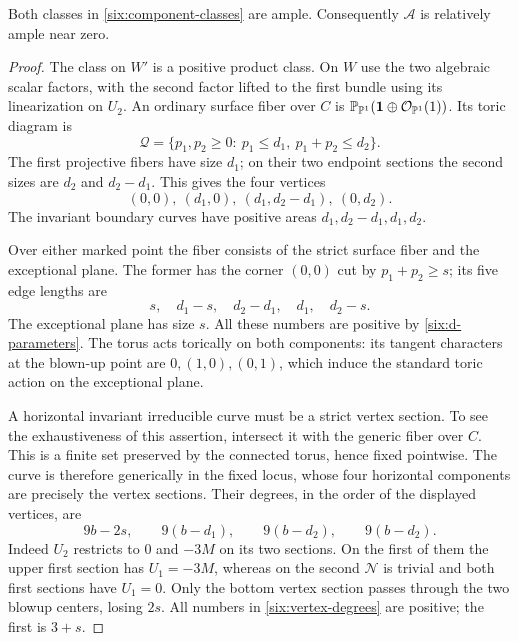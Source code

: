 \begin{lemma}\label{six:cubic-ampleness}
Both classes in \eqref{six:component-classes} are ample.
Consequently \(\mathcal A\) is relatively ample near zero.
\end{lemma}

\begin{proof}
The class on \(W'\) is a positive product class.  On \(W\) use
the two algebraic scalar factors, with the second factor lifted
to the first bundle using its linearization on \(U_2\).
An ordinary surface fiber over \(C\) is
\(\mathbb P_{\mathbb P^1}(\mathbf1\oplus\mathcal O_{\mathbb P^1}(1))\).
Its toric diagram is
\begin{equation}\label{six:diagram}
 \mathcal Q=\{p_1,p_2\ge0:\ p_1\le d_1,\ p_1+p_2\le d_2\}.
\end{equation}
The first projective fibers have size \(d_1\); on their two
endpoint sections the second sizes are \(d_2\) and \(d_2-d_1\).
This gives the four vertices
\[
 (0,0),\ (d_1,0),\ (d_1,d_2-d_1),\ (0,d_2).
\]
The invariant boundary curves have positive areas
\(d_1,d_2-d_1,d_1,d_2\).

Over either marked point the fiber consists of the strict
surface fiber and the exceptional plane.  The former has the
corner \((0,0)\) cut by \(p_1+p_2\ge s\); its five edge lengths
are
\[
 s,\quad d_1-s,\quad d_2-d_1,\quad d_1,\quad d_2-s.
\]
The exceptional plane has size \(s\).  All these numbers are
positive by \eqref{six:d-parameters}.  The torus acts torically
on both components: its tangent characters at the blown-up
point are \(0,(1,0),(0,1)\), which induce the standard toric
action on the exceptional plane.

A horizontal invariant irreducible curve must be a strict
vertex section.  To see the exhaustiveness of this assertion,
intersect it with the generic fiber over \(C\).  This is a finite
set preserved by the connected torus, hence fixed pointwise.
The curve is therefore generically in the fixed locus, whose
four horizontal components are precisely the vertex sections.
Their degrees, in the order of the displayed vertices, are
\begin{equation}\label{six:vertex-degrees}
 9b-2s,\qquad 9(b-d_1),\qquad
 9(b-d_2),\qquad 9(b-d_2).
\end{equation}
Indeed \(U_2\) restricts to \(0\) and \(-3M\) on its two
sections.  On the first of them the upper first section has
\(U_1=-3M\), whereas on the second \(\mathcal N\) is trivial
and both first sections have \(U_1=0\).
Only the bottom vertex section passes through the two blowup
centers, losing \(2s\).  All numbers in
\eqref{six:vertex-degrees} are positive; the first is \(3+s\).


\end{proof}
